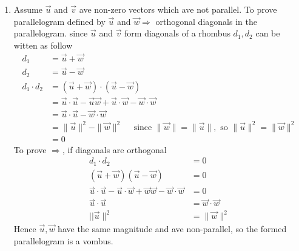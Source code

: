 \documentclass[11pt]{article}
\begin{document}
	\begin{enumerate}[{\bf Q1.}]
	
	\item
	Assume $\vec{u}$ and $\vec{v}$ ave non-zero vectors which ave not parallel.
	To prove parallelogram defined by $\vec{u}$ and $\vec{w} \Rightarrow$ orthogonal diagonals in the parallelogram.
	since $\vec{u}$ and $\vec{v}$ form diagonals of a rhombus $d_1, d_2$ can be witten as follow
	$$
	\begin{aligned}
	d_1 & =\vec{u}+\vec{w} \\
	d_2 & =\vec{u}-\vec{w} \\
	d_1 \cdot d_2 & =(\vec{u}+\vec{w}) \cdot(\vec{u}-\vec{w}) \\
	& =\vec{u} \cdot \vec{u}-\vec{u} \vec{w}+\vec{u} \cdot \vec{w}-\vec{w} \cdot \vec{w} \\
	& =\vec{u} \cdot \vec{u}-\vec{w} \cdot \vec{w} \\
	& =\|\vec{u}\|^2-\|\vec{w}\|^2 \quad \text { since }\|\vec{w}\|=\|\vec{u}\|, \text { so }\|\vec{u}\|^2=\|\vec{w}\|^2 \\
	& =0
	\end{aligned}
	$$
	To prove $\Rightarrow$, if diagonals are orthogonal
	$$
	\begin{aligned}
	d_1 \cdot d_2 & =0 \\
	(\vec{u}+\vec{w})(\vec{u}-\vec{w}) & =0 \\
	\vec{u} \cdot \vec{u}-\vec{u} \cdot \vec{w}+\vec{w} \vec{w}-\vec{w} \cdot \vec{w} & =0 \\
	\vec{u} \cdot \vec{u} & =\vec{w} \cdot \vec{w} \\
	||\vec{u}\|^2 & = \|\vec{w}\|^2
	\end{aligned}
	$$
	Hence $\vec{u}, \vec{w}$ have the same magnitude and ave non-parallel, so the formed parallelogram is a vombus.

	\newpage
	

\end{enumerate}
\end{document}
